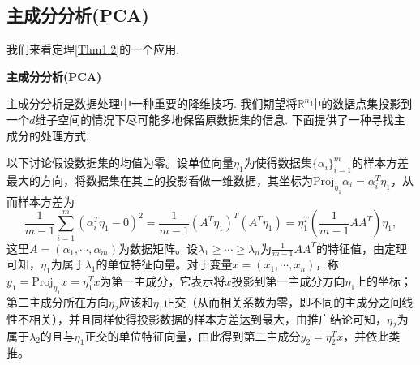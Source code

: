 \subsection{主成分分析(PCA)}
我们来看定理\ref{Thm1.2}的一个应用.
\begin{example}{\textbf{主成分分析(PCA)}}\par
主成分分析是数据处理中一种重要的降维技巧. 我们期望将$\mathbb R^n$中的数据点集投影到一个$d$维子空间的情况下尽可能多地保留原数据集的信息. 下面提供了一种寻找主成分的处理方式.\par
以下讨论假设数据集的均值为零。设单位向量$\eta_1$为使得数据集$\{\alpha_i\}_{i=1}^m$的样本方差最大的方向，将数据集在其上的投影看做一维数据，其坐标为$\mathrm{Proj}_{\eta_1}\alpha_i=\alpha_i^T\eta_1$，从而样本方差为$$\frac{1}{m-1}\sum\limits_{i=1}^m(\alpha_i^T\eta_1-0)^2=\frac{1}{m-1}(A^T\eta_1)^T(A^T\eta_1)=\eta_1^T(\frac{1}{m-1}AA^T)\eta_1,$$
这里$A=(\alpha_1 , \cdots , \alpha_m)$为数据矩阵。设$\lambda_1\geq \cdots \geq \lambda_n$为$\frac{1}{m-1}AA^T$的特征值，由定理可知，$\eta_1$为属于$\lambda_1$的单位特征向量。对于变量$x=(x_1,\cdots,x_n)$，称$y_1=\mathrm{Proj}_{\eta_1}x=\eta_1^T x$为第一主成分，它表示将$x$投影到第一主成分方向$\eta_1$上的坐标；第二主成分所在方向$\eta_2$应该和$\eta_1$正交（从而相关系数为零，即不同的主成分之间线性不相关），并且同样使得投影数据的样本方差达到最大，由推广结论可知，$\eta_2$为属于$\lambda_2$的且与$\eta_1$正交的单位特征向量，由此得到第二主成分$y_2=\eta_2^Tx$，并依此类推。
\end{example}
